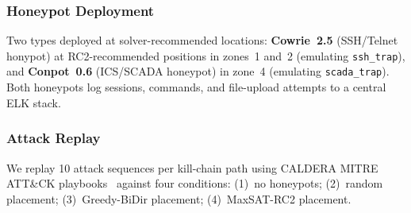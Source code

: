 \documentclass[journal]{IEEEtran}
\begin{document}
\subsubsection{Honeypot Deployment}

Two types deployed at solver-recommended locations:
\textbf{Cowrie~2.5} (SSH/Telnet honypot) at RC2-recommended
positions in zones~1 and~2 (emulating \texttt{ssh\_trap}),
and \textbf{Conpot~0.6} (ICS/SCADA honeypot) in zone~4
(emulating \texttt{scada\_trap}).
Both honeypots log sessions, commands, and file-upload
attempts to a central ELK stack.

\subsubsection{Attack Replay}

We replay 10 attack sequences per kill-chain path using
CALDERA MITRE ATT\&CK playbooks~\cite{applebaum2016}
against four conditions: (1)~no honeypots; (2)~random
placement; (3)~Greedy-BiDir placement; (4)~MaxSAT-RC2
placement.
\end{document}
